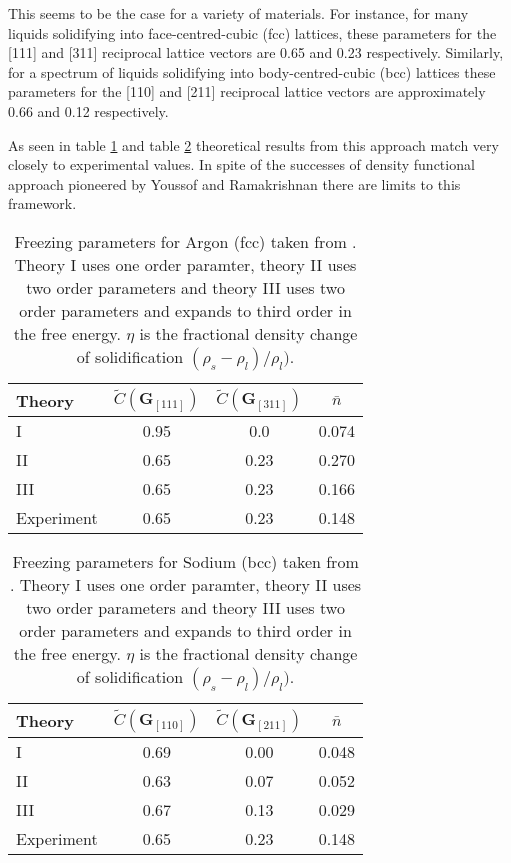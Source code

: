 This seems to be the case for a variety of materials. For instance, for many
liquids solidifying into face-centred-cubic (fcc) lattices, these parameters
for the [111] and [311] reciprocal lattice vectors are 0.65 and 0.23
respectively. Similarly, for a spectrum of liquids solidifying into
body-centred-cubic (bcc) lattices these parameters  for the [110] and [211]
reciprocal lattice vectors are approximately 0.66 and 0.12 respectively.

As seen in table \ref{table:ramakrishnan_argon} and table
\ref{table:ramakrishnan_sodium} theoretical results from this approach match
very closely to experimental values. In spite of the successes of density
functional approach pioneered by Youssof and Ramakrishnan there are limits
to this framework.

\begin{table}[]
    \center
    \begin{tabular}{l c c c}
        \hline 
        Theory & $\tilde{C}(\mathbf{G}_{[111]})$ & $\tilde{C}(\mathbf{G}_{[311]})$ & $\bar{n}$ \\ 
        \hline
        I & 0.95 & 0.0 & 0.074 \\
        II & 0.65 & 0.23 & 0.270 \\
        III & 0.65 & 0.23 & 0.166 \\
        Experiment & 0.65 & 0.23 & 0.148\\
        \hline
    \end{tabular}
    \caption[Freezing parameters for Argon]{Freezing parameters for Argon (fcc)
    taken from \cite{RAMAKRISHNAN79}.  Theory I uses one order paramter, theory
    II uses two order parameters and theory III uses two order parameters and
    expands to third order in the free energy. $\eta$ is the fractional density
    change of solidification 
    $(\rho_s - \rho_l) / \rho_l)$.}
    \label{table:ramakrishnan_argon}
\end{table}

\begin{table}[]
    \center
    \begin{tabular}{l c c c}
        \hline 
        Theory & $\tilde{C}(\mathbf{G}_{[110]})$ & $\tilde{C}(\mathbf{G}_{[211]})$ & $\bar{n}$ \\ 
        \hline
        I           & 0.69 & 0.00 & 0.048 \\
        II          & 0.63 & 0.07 & 0.052 \\
        III         & 0.67 & 0.13 & 0.029 \\
        Experiment  & 0.65 & 0.23 & 0.148\\
        \hline
    \end{tabular}
    \caption[Freezing parameters for Sodium]{Freezing parameters for Sodium
    (bcc) taken from \cite{RAMAKRISHNAN79}.  Theory I uses one order paramter,
    theory II uses two order parameters and theory III uses two order
    parameters and expands to third order in the free energy. $\eta$ is the
    fractional density change of solidification 
    $(\rho_s - \rho_l) / \rho_l)$.}
    \label{table:ramakrishnan_sodium}
\end{table}

